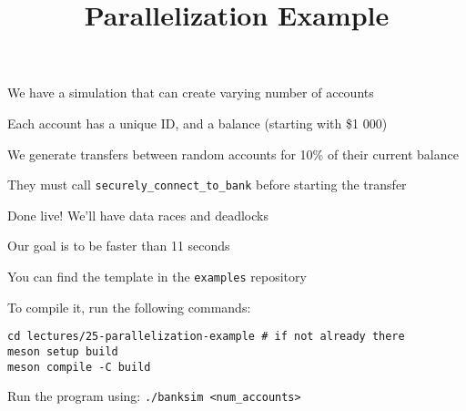 

\title{Parallelization Example}



\begin{frame}
  \titlepage
\end{frame}

\begin{slide}


  We have a simulation that can create varying number of accounts
  \medskip

  Each account has a unique ID, and a balance (starting with \$1 000)
  \medskip

  We generate transfers between random accounts for 10\% of their current
  balance
  \medskip

  They must call \texttt{securely_connect_to_bank} before starting the
  transfer

\end{slide}

\begin{slide}


  Done live! We'll have data races and deadlocks
  \medskip

  Our goal is to be faster than 11 seconds
  \medskip

  You can find the template in the \texttt{examples} repository
  \bigskip

  To compile it, run the following commands:

  \begin{verbatim}
cd lectures/25-parallelization-example # if not already there
meson setup build
meson compile -C build
  \end{verbatim}
  \medskip

  Run the program using: \texttt{./banksim <num_accounts>}
\end{slide}


